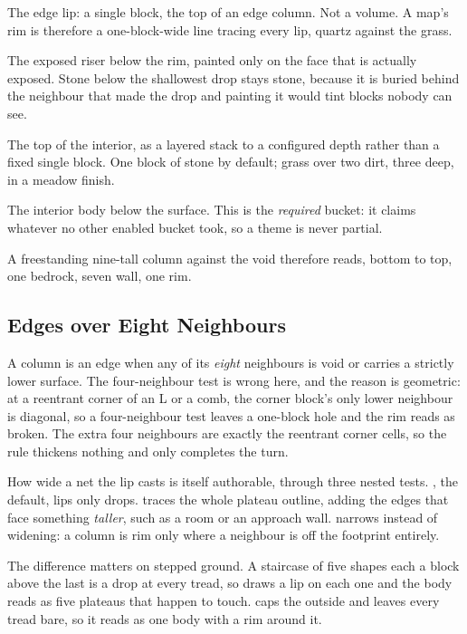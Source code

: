 \begin{description}[leftmargin=1.6em,style=nextline,itemsep=4pt]
  \item[Rim] The edge lip: a single block, the top of an edge column. Not a volume.
    A map's rim is therefore a one-block-wide line tracing every lip, quartz
    against the grass.
  \item[Wall] The exposed riser below the rim, painted only on the face that is
    actually exposed. Stone below the shallowest drop stays stone, because it is
    buried behind the neighbour that made the drop and painting it would tint
    blocks nobody can see.
  \item[Surface] The top of the interior, as a layered stack to a configured depth
    rather than a fixed single block. One block of stone by default; grass over two
    dirt, three deep, in a meadow finish.
  \item[Fill] The interior body below the surface. This is the \emph{required}
    bucket: it claims whatever no other enabled bucket took, so a theme is never
    partial.
\end{description}

A freestanding nine-tall column against the void therefore reads, bottom to top,
one bedrock, seven wall, one rim.

\subsection{Edges over Eight Neighbours}

A column is an edge when any of its \emph{eight} neighbours is void or carries a
strictly lower surface. The four-neighbour test is wrong here, and the reason is
geometric: at a reentrant corner of an L or a comb, the corner block's only lower
neighbour is diagonal, so a four-neighbour test leaves a one-block hole and the rim
reads as broken. The extra four neighbours are exactly the reentrant corner cells,
so the rule thickens nothing and only completes the turn.

How wide a net the lip casts is itself authorable, through three nested tests.
, the default, lips only drops.  traces the whole plateau
outline, adding the edges that face something \emph{taller}, such as a room or an
approach wall.  narrows instead of widening: a column is rim only where a
neighbour is off the footprint entirely.

The difference matters on stepped ground. A staircase of five shapes each a block
above the last is a drop at every tread, so  draws a lip on each one and
the body reads as five plateaus that happen to touch.  caps the outside
and leaves every tread bare, so it reads as one body with a rim around it.

